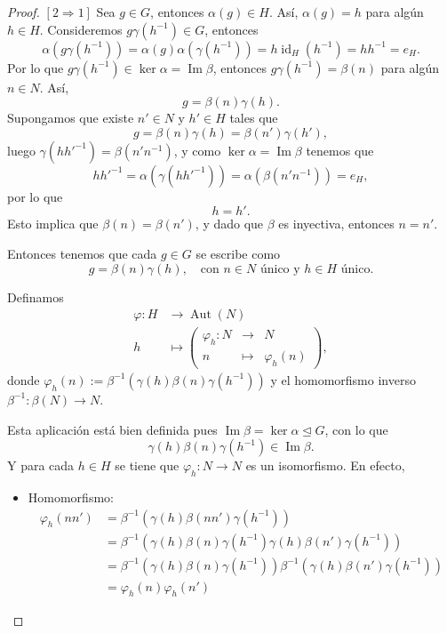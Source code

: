 \begin{proof}
	\noindent
	$[2 \Rightarrow 1]$ Sea $g\in G$, entonces $\alpha(g)\in H$. Así, $\alpha(g)=h$ para algún $h\in H$. Consideremos $g\gamma(h^{-1})\in G$, entonces
	$$\alpha\left(g\gamma(h^{-1})\right)=\alpha(g)\alpha\left(\gamma(h^{-1})\right)=h\operatorname{id}_H(h^{-1})=hh^{-1}=e_H.$$ 
	Por lo que $g\gamma(h^{-1})\in \ker \alpha=\operatorname{Im}\beta$, entonces $g\gamma(h^{-1})=\beta(n)$ para algún $n\in N$. Así, $$g=\beta(n)\gamma(h).$$ 
	Supongamos que existe $n'\in N$ y $h'\in H$ tales que $$g=\beta(n)\gamma(h)=\beta(n')\gamma(h'),$$ luego $\gamma(hh'^{-1})=\beta(n'n^{-1})$, y como $\ker \alpha =\operatorname{Im}\beta$ tenemos que $$hh'^{-1}=\alpha\left(\gamma\left(hh'^{-1}\right)\right)=\alpha\left(\beta(n'n^{-1})\right)=e_H,$$ por lo que $$h=h'.$$ 
	Esto implica que $\beta(n)=\beta(n')$, y dado que $\beta$ es inyectiva, entonces $n=n'$.
	
	\medskip
	\noindent Entonces tenemos que cada $g\in G$ se escribe como 
	\begin{equation}\label{poiuhygf}
		g=\beta(n)\gamma(h),\quad \text{con }n\in N\text{ único y }h\in H\text{ único.}
	\end{equation}
	
	\medskip
	\noindent
	Definamos
	\begin{align*}
		\varphi: H &\longrightarrow \operatorname{Aut}(N) \\[4pt]
		h &\longmapsto \left(  
		\begin{array}{rcl}
			\varphi_h : N &\to& N \\[2pt]
			n &\mapsto& \varphi_h(n)
		\end{array} \right),
	\end{align*}
	donde $\varphi_h(n):=\beta^{-1}\left(\gamma(h)\beta(n)\gamma(h^{-1})\right)$ y el homomorfismo inverso $\beta^{-1}: \beta(N)\to N$.
	
	\medskip
	\noindent Esta aplicación está bien definida pues $\operatorname{Im}\beta=\ker \alpha \trianglelefteq G$, con lo que $$\gamma(h)\beta(n)\gamma(h^{-1})\in \operatorname{Im}\beta.$$ 
	Y para cada $h\in H$ se tiene que $\varphi_h: N\to N$ es un isomorfismo. En efecto,
	
	\begin{itemize}
		\item Homomorfismo:
		\begin{align*}
			\varphi_h(nn')    & =\beta^{-1}\left(\gamma(h)\beta(nn')\gamma(h^{-1})\right)\\
			& =\beta^{-1}\left(\gamma(h)\beta(n)\gamma(h^{-1})\gamma(h)\beta(n')\gamma(h^{-1})\right) \\
			&= \beta^{-1}\left(\gamma(h)\beta(n)\gamma(h^{-1})\right) \beta^{-1}\left(\gamma(h)\beta(n')\gamma(h^{-1})\right)\\
			&=\varphi_h(n)\varphi_h(n')
		\end{align*}
		

\end{itemize}
\end{proof}
